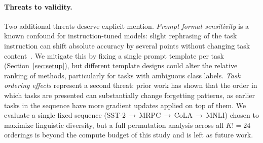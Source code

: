 \paragraph{Threats to validity.}
Two additional threats deserve explicit mention.
\emph{Prompt format sensitivity} is a known confound for instruction-tuned models: slight
rephrasing of the task instruction can shift absolute accuracy by several points without changing
task content~\cite{luo2023empirical}.
We mitigate this by fixing a single prompt template per task (Section~\ref{sec:setup}), but
different template designs could alter the relative ranking of methods, particularly for tasks with
ambiguous class labels.
\emph{Task ordering effects} represent a second threat: prior work has shown that the order in
which tasks are presented can substantially change forgetting patterns, as earlier tasks in the
sequence have more gradient updates applied on top of them.
We evaluate a single fixed sequence (SST-2\,$\to$\,MRPC\,$\to$\,CoLA\,$\to$\,MNLI) chosen to
maximize linguistic diversity, but a full permutation analysis across all $K! = 24$ orderings is
beyond the compute budget of this study and is left as future work.
